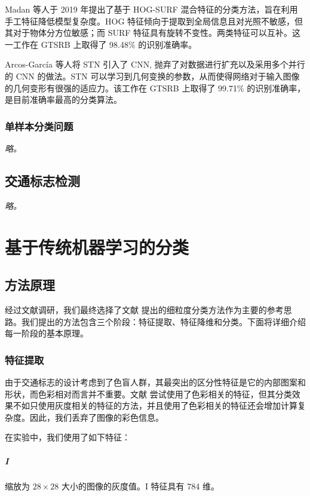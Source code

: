 \documentclass{report}
\begin{document}
Madan \cite{HOG-SURF} 等人于 2019 年提出了基于 HOG-SURF 混合特征的分类方法，旨在利用手工特征降低模型复杂度。HOG 特征倾向于提取到全局信息且对光照不敏感，但其对于物体分方位敏感；而 SURF 特征具有旋转不变性。两类特征可以互补。这一工作在 GTSRB 上取得了 98.48\% 的识别准确率。

Arcos-García \cite{STN-CNN} 等人将 STN 引入了 CNN, 抛弃了对数据进行扩充以及采用多个并行的 CNN 的做法。STN 可以学习到几何变换的参数，从而使得网络对于输入图像的几何变形有很强的适应力。该工作在 GTSRB 上取得了 99.71\% 的识别准确率，是目前准确率最高的分类算法。

\subsection{单样本分类问题}

\emph{略。}

\section{交通标志检测}

\emph{略。}

\chapter{基于传统机器学习的分类}

\section{方法原理}

经过文献调研，我们最终选择了文献 \cite{Mathias} 提出的细粒度分类方法作为主要的参考思路。我们提出的方法包含三个阶段：特征提取、特征降维和分类。下面将详细介绍每一阶段的基本原理。

\subsection{特征提取}

由于交通标志的设计考虑到了色盲人群，其最突出的区分性特征是它的内部图案和形状，而色彩相对而言并不重要。文献 \cite{Mathias} 尝试使用了色彩相关的特征，但其分类效果不如只使用灰度相关的特征的方法，并且使用了色彩相关的特征还会增加计算复杂度。因此，我们丢弃了图像的彩色信息。

在实验中，我们使用了如下特征：

\paragraph{I}
缩放为 $28 \times 28$ 大小的图像的灰度值。I 特征具有 784 维。
\end{document}
